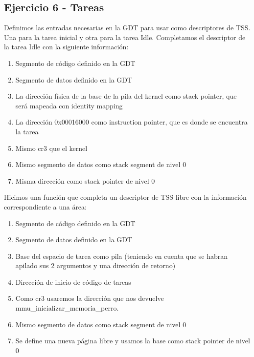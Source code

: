 \documentclass[10pt,a4paper,spanish]{article}
\begin{document}
\subsection{Ejercicio 6 - Tareas}
Definimos las entradas necesarias en la GDT para usar como descriptores de TSS. Una para la tarea inicial y otra para la tarea Idle.
Completamos el descriptor de la tarea Idle con la siguiente información:
\begin{enumerate}
	\item Segmento de código definido en la GDT
	\item Segmento de datos definido en la GDT
	\item La dirección física de la base de la pila del kernel como stack pointer, que será mapeada con identity mapping
	\item La dirección 0x00016000 como instruction pointer, que es donde se encuentra la tarea
	\item Mismo cr3 que el kernel
	\item Mismo segmento de datos como stack segment de nivel 0
	\item Misma dirección como stack pointer de nivel 0
\end{enumerate}

Hicimos una función que completa un descriptor de TSS libre con la información correspondiente a una área:
\begin{enumerate}
	\item Segmento de código definido en la GDT
	\item Segmento de datos definido en la GDT
	\item Base del espacio de tarea como pila (teniendo en cuenta que se habran apilado sus 2 argumentos y una dirección de retorno)
	\item Dirección de inicio de código de tareas
	\item Como cr3 usaremos la dirección que nos devuelve mmu\_inicializar\_memoria\_perro.
	\item Mismo segmento de datos como stack segment de nivel 0
	\item Se define una nueva página libre y usamos la base como stack pointer de nivel 0
\end{enumerate}
\end{document}
